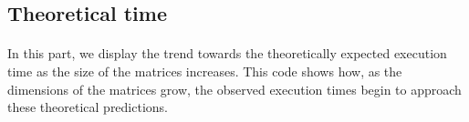     \vspace*{0.5cm}

    

    \begin{figure}[h]
        \begin{center}
            
        \end{center}
        \caption{}
        \label{}
    \end{figure}


\subsection{Theoretical time}

    \paragraph*{}
    In this part, we display the trend towards the theoretically expected execution time as the size of the matrices increases. 
    This code shows how, as the dimensions of the matrices grow, the observed execution times begin to approach these theoretical 
    predictions.
    \par

    \vspace*{0.5cm}

    

    \begin{center}
        
    \end{center}
\newpage
